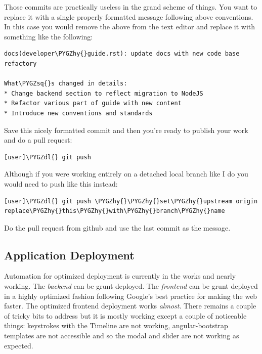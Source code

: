 \documentclass[letterpaper,10pt,english]{sphinxmanual}
\def\PYGZdl{\char`\$}
\def\PYGZhy{\char`\-}
\def\PYGZsq{\char`\'}
\renewcommand\PYGZsq{\textquotesingle}
\begin{document}
Those commits are practically useless in the grand scheme of
things. You want to replace it with a single properly formatted
message following above conventions. In this case you would remove the
above from the text editor and replace it with something like the
following:

\begin{Verbatim}[commandchars=\\\{\}]
docs(developer\PYGZhy{}guide.rst): update docs with new code base refactory

What\PYGZsq{}s changed in details:
* Change backend section to reflect migration to NodeJS
* Refactor various part of guide with new content
* Introduce new conventions and standards
\end{Verbatim}

Save this nicely formatted commit and then you're ready to publish
your work and do a pull request:

\begin{Verbatim}[commandchars=\\\{\}]
[user]\PYGZdl{} git push
\end{Verbatim}

Although if you were working entirely on a detached local branch like
I do you would need to push like this instead:

\begin{Verbatim}[commandchars=\\\{\}]
[user]\PYGZdl{} git push \PYGZhy{}\PYGZhy{}set\PYGZhy{}upstream origin replace\PYGZhy{}this\PYGZhy{}with\PYGZhy{}branch\PYGZhy{}name
\end{Verbatim}

Do the pull request from github and use the last commit as the message.


\subsection{Application Deployment}
\label{developer-guide:application-deployment}
Automation for optimized deployment is currently in the works and
nearly working. The \emph{backend} can be grunt deployed. The \emph{frontend}
can be grunt deployed in a highly optimized fashion following Google's
best practice for making the web faster. The optimized frontend
deployment works \emph{almost}. There remains a couple of tricky bits to
address but it is mostly working except a couple of noticeable things:
keystrokes with the Timeline are not working, angular-bootstrap
templates are not accessible and so the modal and slider are not
working as expected.
\end{document}
